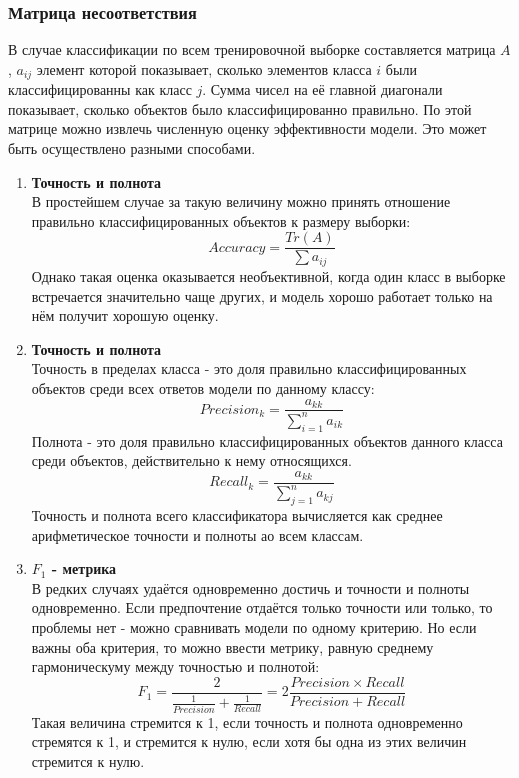 \documentclass{article}
\begin{document}
        \subsubsection*{Матрица несоответствия}
            В случае классификации по всем тренировочной выборке составляется матрица $A$, $a_{ij}$ элемент которой показывает, сколько элементов класса $i$ были классифицированны как класс $j$. Сумма чисел на её главной диагонали показывает, сколько объектов было классифицированно правильно. По этой матрице можно извлечь численную оценку эффективности модели. Это может быть осуществлено разными способами.
            \begin{enumerate}
                \item \textbf{Точность и полнота} \\ 
                    В простейшем случае за такую величину можно принять отношение  правильно классифицированных объектов к размеру выборки: 
                    $$Accuracy = \frac{Tr(A)}{\sum a_{ij}}$$ 
                    Однако такая оценка оказывается необъективной, когда один класс в выборке встречается значительно чаще других, и модель хорошо работает только на нём получит хорошую оценку.
                \item \textbf{Точность и полнота} \\
                    Точность в пределах класса - это доля правильно классифицированных объектов среди всех ответов модели по данному классу:
                    $$Precision_k = \frac{a_{kk}}{\sum\limits_{i = 1}^n a_{i k}}$$
                    Полнота - это доля правильно классифицированных объектов данного класса среди объектов, действительно к нему относящихся.
                    $$Recall_k = \frac{a_{kk}}{\sum\limits_{j = 1}^n a_{kj}}$$
                    Точность и полнота всего классификатора вычисляется как среднее арифметическое точности и полноты ао всем классам.
                \item \textbf{$F_1$ - метрика} \\
                    В редких случаях удаётся одновременно достичь и точности и полноты одновременно. Если предпочтение отдаётся только точности или только, то проблемы нет - можно сравнивать модели по одному критерию. Но если важны оба критерия, то можно ввести метрику, равную среднему гармоническуму между точностью и полнотой:
                    $$F_1 = \frac{2}{\frac{1}{Precision} + \frac{1}{Recall}} = 2 \frac{Precision \times Recall}{Precision + Recall}$$
                    Такая величина стремится к 1, если точность и полнота одновременно стремятся к 1, и стремится к нулю, если хотя бы одна из этих величин стремится к нулю. 
            \end{enumerate}
        
\end{document}
